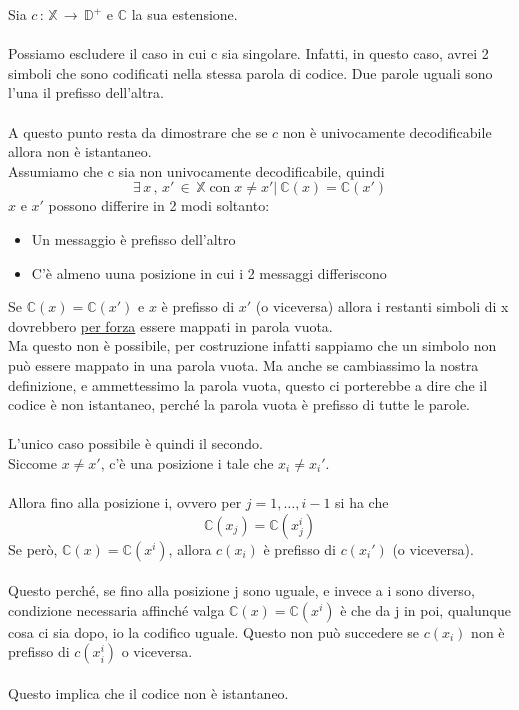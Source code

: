 \documentclass[12pt]{report}
\begin{document}
    \begin{dimo}
        Sia $c\,:\,\mathbb{X} \, \rightarrow \, \mathbb{D}^+$ e $\mathbb{C}$ la sua estensione. \\ \\
        Possiamo escludere il caso in cui c sia singolare. Infatti, in questo caso, avrei 2 simboli che sono codificati nella stessa parola di codice. Due parole uguali sono l'una il prefisso dell'altra. \\ \\
        A questo punto resta da dimostrare che se $c$ non è univocamente decodificabile allora non è istantaneo. \\
        Assumiamo che c sia non univocamente decodificabile, quindi \begin{equation} \label{eq:one}
        \exists \, x \,,\,x' \, \in \, \mathbb{X}\; \text{con} \; x \neq x' | \ \mathbb{C}(x) = \mathbb{C}(x')
        \end{equation}
        $x$ e $x'$ possono differire in 2 modi soltanto:
        \begin{itemize}
            \item Un messaggio è prefisso dell'altro
            \item C'è almeno uuna posizione in cui i 2 messaggi differiscono
        \end{itemize}
        Se $\mathbb{C}(x) = \mathbb{C}(x')$ e $x$ è prefisso di $x'$ (o viceversa) allora i restanti simboli di x dovrebbero \underline{per forza} essere mappati in parola vuota. \\ Ma questo non è possibile, per costruzione infatti sappiamo che un simbolo non può essere mappato in una parola vuota. Ma anche se cambiassimo la nostra definizione, e ammettessimo la parola vuota, questo ci porterebbe a dire che il codice è non istantaneo, perché la parola vuota è prefisso di tutte le parole.
        \\ \\
        L'unico caso possibile è quindi il secondo. \\ Siccome $x \neq x'$, c'è una posizione i tale che $x_i \neq x_i'$.
        \\ \\
        Allora fino alla posizione i, ovvero per $j = 1,\dots,i-1$ si ha che
        $$\mathbb{C}(x_j) = \mathbb{C}(x_j^{i})$$
        Se però, $\mathbb{C}(x) = \mathbb{C}(x^{i})$, allora $c(x_i)$ è prefisso di $c(x_i')$ (o viceversa). \\ \\

        \noindent Questo perché, se fino alla posizione j sono uguale, e invece a i sono diverso, condizione necessaria affinché valga  $\mathbb{C}(x) = \mathbb{C}(x^{i})$ è che da j in poi, qualunque cosa ci sia dopo, io la codifico uguale. Questo non può succedere se $c(x_i)$ non è prefisso di $c(x_i^{i})$ o viceversa.
        \\ \\
        Questo implica che il codice non è istantaneo.
    \end{dimo}
\end{document}
